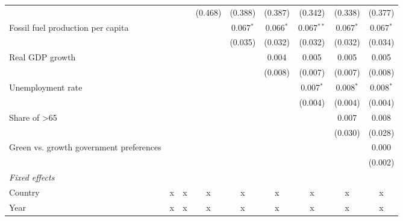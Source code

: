 \begin{table}[htbp]
\begin{tabular}{lcccccccc}
                                                              &                &         & (0.468) & (0.388)     & (0.387)     & (0.342)      & (0.338)     & (0.377)\\   
      Fossil fuel production per capita                       &                &         &         & 0.067$^{*}$ & 0.066$^{*}$ & 0.067$^{**}$ & 0.067$^{*}$ & 0.067$^{*}$\\   
                                                              &                &         &         & (0.035)     & (0.032)     & (0.032)      & (0.032)     & (0.034)\\   
      Real GDP growth                                         &                &         &         &             & 0.004       & 0.005        & 0.005       & 0.005\\   
                                                              &                &         &         &             & (0.008)     & (0.007)      & (0.007)     & (0.008)\\   
      Unemployment rate                                       &                &         &         &             &             & 0.007$^{*}$  & 0.008$^{*}$ & 0.008$^{*}$\\   
                                                              &                &         &         &             &             & (0.004)      & (0.004)     & (0.004)\\   
      Share of >65                                            &                &         &         &             &             &              & 0.007       & 0.008\\   
                                                              &                &         &         &             &             &              & (0.030)     & (0.028)\\   
      Green vs. growth government preferences                 &                &         &         &             &             &              &             & 0.000\\   
                                                              &                &         &         &             &             &              &             & (0.002)\\   
      \emph{Fixed effects}\\
      Country                                                 & x              & x       & x       & x           & x           & x            & x           & x\\  
      Year                                                    & x              & x       & x       & x           & x           & x            & x           & x\\  

\end{tabular}
\end{table}
